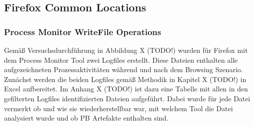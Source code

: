 \begin{appendices}
		
%		

\subsection*{Firefox Common Locations}

\subsubsection*{Process Monitor WriteFile Operations}

Gemäß Versuchsdurchführung in Abbildung X (TODO!) wurden für Firefox mit dem Process Monitor Tool zwei Logfiles erstellt. Diese Dateien enthalten alle aufgezeichneten Prozessaktivitäten während und nach dem Browsing Szenario.
Zunächst werden die beiden Logfiles gemäß Methodik in Kapitel X (TODO!) in Excel aufbereitet. 
Im Anhang X (TODO!) ist dazu eine Tabelle mit allen in den gefilterten Logfiles identifizierten Dateien aufgeführt.
Dabei wurde für jede Datei vermerkt
ob und wie sie wiederherstellbar war, mit welchem Tool die Datei analysiert wurde und ob PB Artefakte enthalten sind.


\end{appendices}

